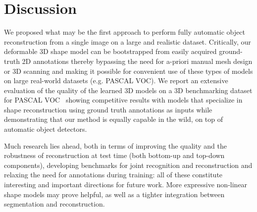\section{Discussion}
We proposed what may be the first approach to perform fully automatic object reconstruction from a single image on a large and realistic dataset. Critically, our deformable 3D shape model can be bootstrapped from easily acquired ground-truth 2D annotations thereby bypassing the need for a-priori manual mesh design or 3D scanning and making it possible for convenient use of these types of models on large real-world datasets (e.g. PASCAL VOC). We report an extensive evaluation of the quality of the learned 3D models on a 3D benchmarking dataset for PASCAL VOC~\cite{pascal3d} showing competitive results with models that specialize in shape reconstruction using ground truth annotations as inputs while demonstrating that our method is equally capable in the wild, on top of automatic object detectors.

Much research lies ahead, both in terms of improving the quality and the robustness of reconstruction at test time (both bottom-up and top-down components), developing benchmarks for joint recognition and reconstruction and relaxing the need for annotations during training: all of these constitute interesting and important directions for future work. More expressive non-linear shape models \cite{wu20143d} may prove helpful, as well as a tighter integration between segmentation and reconstruction.



